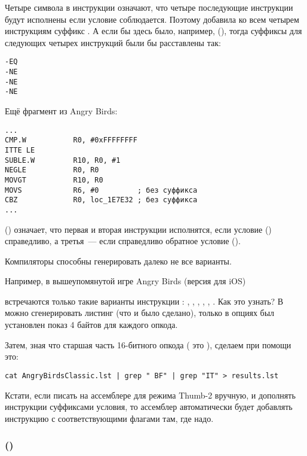 Четыре символа  в инструкции означают, что четыре последующие инструкции будут исполнены если условие соблюдается.
Поэтому \IDA добавила ко всем четырем инструкциям суффикс . 
А если бы здесь было, например,
 (), 
тогда суффиксы для следующих четырех инструкций были бы расставлены так:

\begin{lstlisting}
-EQ
-NE
-NE
-NE
\end{lstlisting}

Ещё фрагмент из Angry Birds:

\begin{lstlisting}[caption=Angry Birds Classic]
...
CMP.W           R0, #0xFFFFFFFF
ITTE LE
SUBLE.W         R10, R0, #1
NEGLE           R0, R0
MOVGT           R10, R0
MOVS            R6, #0         ; без суффикса
CBZ             R0, loc_1E7E32 ; без суффикса
...
\end{lstlisting}

 () 
означает, что первая и вторая инструкции исполнятся, если условие  ()
справедливо, а третья~--- если справедливо обратное условие (\EMDASH{}).

Компиляторы способны генерировать далеко не все варианты.

Например, в вышеупомянутой игре Angry Birds (версия  для iOS)

встречаются только такие варианты инструкции : 
, , , , , .
\myindex{\GrepUsage}
Как это узнать?
В \IDA можно сгенерировать листинг (что и было сделано), только в опциях был установлен показ 4 байтов для каждого опкода.

Затем, зная что старшая часть 16-битного опкода ( это ), сделаем при помощи  это:

\begin{lstlisting}
cat AngryBirdsClassic.lst | grep " BF" | grep "IT" > results.lst
\end{lstlisting}

Кстати, если писать на ассемблере для режима Thumb-2 вручную, и дополнять инструкции суффиксами
условия, то ассемблер автоматически будет добавлять инструкцию  с соответствующими флагами там,
где надо.

\subsubsection{\NonOptimizingXcodeIV (\ARMMode)}

